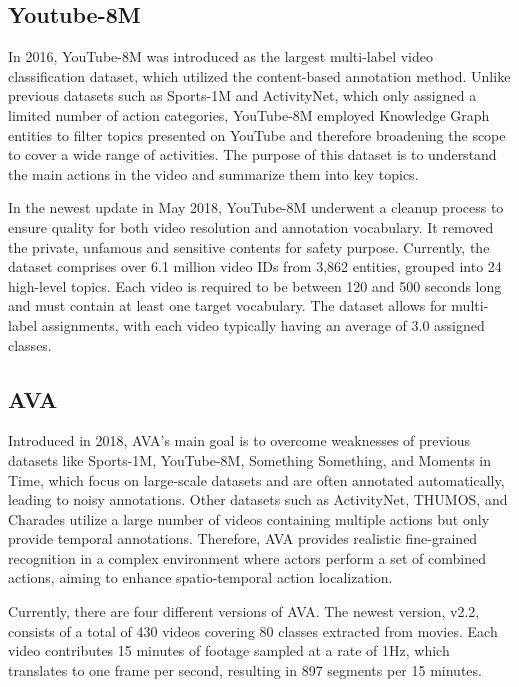 \documentclass[a4paper]{article}
\begin{document}
\subsection{Youtube-8M}
In 2016, YouTube-8M was introduced as the largest multi-label video classification dataset, which utilized the content-based annotation method. Unlike previous datasets such as Sports-1M and ActivityNet, which only assigned a limited number of action categories, YouTube-8M employed Knowledge Graph entities to filter topics presented on YouTube and therefore broadening the scope to cover a wide range of activities. The purpose of this dataset is to understand the main actions in the video and summarize them into key topics.

In the newest update in May 2018, YouTube-8M underwent a cleanup process to ensure quality for both video resolution and annotation vocabulary. It removed the private, unfamous and sensitive contents for safety purpose. Currently, the dataset comprises over 6.1 million video IDs from 3,862 entities, grouped into 24 high-level topics. Each video is required to be between 120 and 500 seconds long and must contain at least one target vocabulary. The dataset allows for multi-label assignments, with each video typically having an average of 3.0 assigned classes. 
\subsection{AVA}
Introduced in 2018, AVA's main goal is to overcome weaknesses of previous datasets like Sports-1M, YouTube-8M, Something Something, and Moments in Time, which focus on large-scale datasets and are often annotated automatically, leading to noisy annotations. Other datasets such as ActivityNet, THUMOS, and Charades utilize a large number of videos containing multiple actions but only provide temporal annotations. Therefore, AVA provides realistic fine-grained recognition in a complex environment where actors perform a set of combined actions, aiming to enhance spatio-temporal action localization.

Currently, there are four different versions of AVA. The newest version, v2.2, consists of a total of 430 videos covering 80 classes extracted from movies. Each video contributes 15 minutes of footage sampled at a rate of 1Hz, which translates to one frame per second, resulting in 897 segments per 15 minutes.
\end{document}

